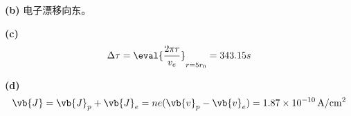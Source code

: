 \noindent \textbf{(b)} 电子漂移向东。

\noindent \textbf{(c)}
\begin{equation}
    \Delta \tau = 
  \eval{\frac{2 \pi r}{v_e}}_{r=5 r_0} = 343.15s
\end{equation}

\noindent \textbf{(d)}
\begin{equation}
    \vb{J} = \vb{J}_p + \vb{J}_e = ne(\vb{v}_p - \vb{v}_e) = \SI{1.87e-10}{A/cm^2}
\end{equation}


